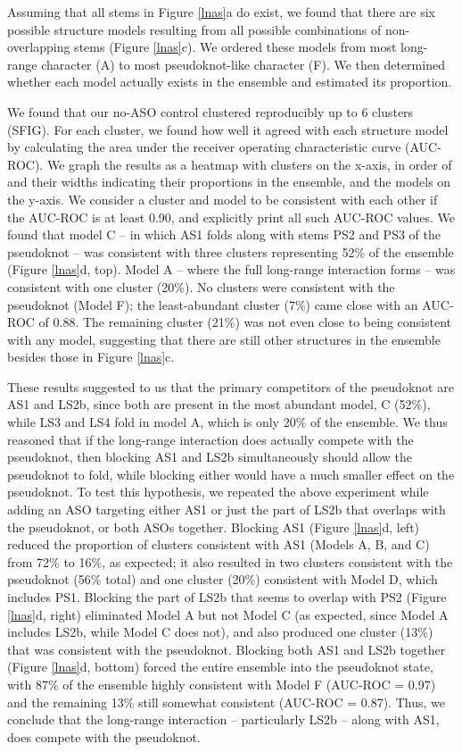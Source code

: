 \documentclass[main.tex]{subfiles}
\begin{document}
Assuming that all stems in Figure \ref{lnas}a do exist, we found that there are six possible structure models resulting from all possible combinations of non-overlapping stems (Figure \ref{lnas}c).
We ordered these models from most long-range character (A) to most pseudoknot-like character (F).
We then determined whether each model actually exists in the ensemble and estimated its proportion.

We found that our no-ASO control clustered reproducibly up to 6 clusters (SFIG).
For each cluster, we found how well it agreed with each structure model by calculating the area under the receiver operating characteristic curve (AUC-ROC).
We graph the results as a heatmap with clusters on the x-axis, in order of and their widths indicating their proportions in the ensemble, and the models on the y-axis.
We consider a cluster and model to be consistent with each other if the AUC-ROC is at least 0.90, and explicitly print all such AUC-ROC values.
We found that model C -- in which AS1 folds along with stems PS2 and PS3 of the pseudoknot -- was consistent with three clusters representing 52\% of the ensemble (Figure \ref{lnas}d, top).
Model A -- where the full long-range interaction forms -- was consistent with one cluster (20\%).
No clusters were consistent with the pseudoknot (Model F); the least-abundant cluster (7\%) came close with an AUC-ROC of 0.88.
The remaining cluster (21\%) was not even close to being consistent with any model, suggesting that there are still other structures in the ensemble besides those in Figure \ref{lnas}c.

These results suggested to us that the primary competitors of the pseudoknot are AS1 and LS2b, since both are present in the most abundant model, C (52\%), while LS3 and LS4 fold in model A, which is only 20\% of the ensemble.
We thus reasoned that if the long-range interaction does actually compete with the pseudoknot, then blocking AS1 and LS2b simultaneously should allow the pseudoknot to fold, while blocking either would have a much smaller effect on the pseudoknot.
To test this hypothesis, we repeated the above experiment while adding an ASO targeting either AS1 or just the part of LS2b that overlaps with the pseudoknot, or both ASOs together.
Blocking AS1 (Figure \ref{lnas}d, left) reduced the proportion of clusters consistent with AS1 (Models A, B, and C) from 72\% to 16\%, as expected; it also resulted in two clusters consistent with the pseudoknot (56\% total) and one cluster (20\%) consistent with Model D, which includes PS1.
Blocking the part of LS2b that seems to overlap with PS2 (Figure \ref{lnas}d, right) eliminated Model A but not Model C (as expected, since Model A includes LS2b, while Model C does not), and also produced one cluster (13\%) that was consistent with the pseudoknot.
Blocking both AS1 and LS2b together (Figure \ref{lnas}d, bottom) forced the entire ensemble into the pseudoknot state, with 87\% of the ensemble highly consistent with Model F (AUC-ROC = 0.97) and the remaining 13\% still somewhat consistent (AUC-ROC = 0.87).
Thus, we conclude that the long-range interaction -- particularly LS2b -- along with AS1, does compete with the pseudoknot.
\end{document}

